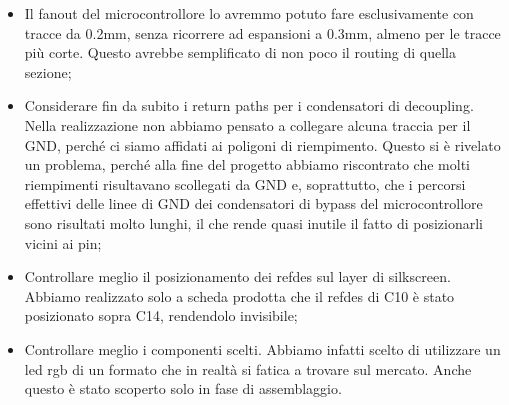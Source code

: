 \begin{itemize}
\item
  
  Il fanout del microcontrollore lo avremmo potuto fare esclusivamente
  con tracce da 0.2mm, senza ricorrere ad espansioni a 0.3mm, almeno per
  le tracce più corte. Questo avrebbe semplificato di non poco il
  routing di quella sezione;
  
\item
  
  Considerare fin da subito i return paths per i condensatori di
  decoupling. Nella realizzazione non abbiamo pensato a collegare alcuna
  traccia per il GND, perché ci siamo affidati ai poligoni di
  riempimento. Questo si è rivelato un problema, perché alla fine del
  progetto abbiamo riscontrato che molti riempimenti risultavano
  scollegati da GND e, soprattutto, che i percorsi effettivi delle linee
  di GND dei condensatori di bypass del microcontrollore sono risultati
  molto lunghi, il che rende quasi inutile il fatto di posizionarli
  vicini ai pin;
  
\item
  
  Controllare meglio il posizionamento dei refdes sul layer di
  silkscreen. Abbiamo realizzato solo a scheda prodotta che il refdes di
  C10 è stato posizionato sopra C14, rendendolo invisibile;
  
\item
  
  Controllare meglio i componenti scelti. Abbiamo infatti scelto di
  utilizzare un led rgb di un formato che in realtà si fatica a trovare sul
  mercato. Anche questo è stato scoperto solo in fase di assemblaggio.
  
\end{itemize}